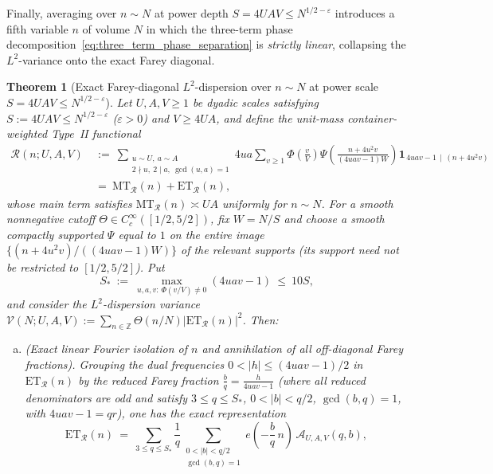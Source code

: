 \documentclass[11pt, a4paper]{article}
\theoremstyle{plain}
\newtheorem{theorem}{Theorem}[section]
\theoremstyle{definition}
\newcommand{\Z}{\mathbb{Z}}
\begin{document}
Finally, averaging over $n\sim N$ at power depth $S=4UAV\le N^{1/2-\varepsilon}$ introduces a fifth variable $n$ of volume $N$ in which the three-term phase decomposition~\eqref{eq:three_term_phase_separation} is \emph{strictly linear}, collapsing the $L^{2}$-variance onto the exact Farey diagonal.

\begin{theorem}[Exact Farey-diagonal $L^{2}$-dispersion over $n\sim N$ at power scale $S=\allowbreak 4UAV\le\allowbreak N^{1/2-\varepsilon}$]\label{thm:farey_diagonal_L2_dispersion}
Let $U,A,V\ge1$ be dyadic scales satisfying $S:=4UAV\le N^{1/2-\varepsilon}$ ($\varepsilon>0$) and $V\ge 4UA$, and define the unit-mass container-weighted Type~II functional
\begin{equation}\label{eq:unit_mass_R_n}
\begin{split}
\mathcal{R}(n;U,A,V)\ &:=\ \sum_{\substack{u\sim U,\ a\sim A\\ 2\nmid u,\ 2\mid a,\ \gcd(u,a)=1}}4ua\sum_{v\ge1}\Phi\!\left(\frac{v}{V}\right)\Psi\!\left(\frac{n+4u^{2}v}{(4uav-1)W}\right)\mathbf{1}_{\,4uav-1\,\mid\,(n+4u^{2}v)}\\
&=\ \mathrm{MT}_{\mathcal{R}}(n)+\mathrm{ET}_{\mathcal{R}}(n),
\end{split}
\end{equation}
whose main term satisfies $\mathrm{MT}_{\mathcal{R}}(n)\asymp UA$ uniformly for $n\sim N$. For a smooth nonnegative cutoff $\Theta\in C_c^{\infty}([1/2,5/2])$, fix $W=N/S$ and choose a smooth compactly supported $\Psi$ equal to $1$ on the entire image $\{(n+4u^{2}v)/((4uav-1)W)\}$ of the relevant supports (its support need not be restricted to $[1/2,5/2]$). Put
\[
S_{\ast}\ :=\ \max_{u,a,v:\,\Phi(v/V)\ne0}(4uav-1)\ \le\ 10S,
\]
and consider the $L^{2}$-dispersion variance $\mathcal{V}(N;U,A,V):=\sum_{n\in\Z}\Theta(n/N)\big|\mathrm{ET}_{\mathcal{R}}(n)\big|^{2}$. Then:
\begin{enumerate}[(a)]
    \item \emph{(Exact linear Fourier isolation of $n$ and annihilation of all off-diagonal Farey fractions).} Grouping the dual frequencies $0<|h|\le(4uav-1)/2$ in $\mathrm{ET}_{\mathcal{R}}(n)$ by the reduced Farey fraction $\frac{b}{q}=\frac{h}{4uav-1}$ (where all reduced denominators are odd and satisfy $3\le q\le S_{\ast}$, $0<|b|<q/2$, $\gcd(b,q)=1$, with $4uav-1=qr$), one has the exact representation
    \begin{equation}\label{eq:Farey_grouped_ET}
    \mathrm{ET}_{\mathcal{R}}(n)\ =\ \sum_{3\le q\le S_{\ast}}\frac{1}{q}\sum_{\substack{0<|b|<q/2\\ \gcd(b,q)=1}}e\!\left(-\frac{b}{q}\,n\right)\,\mathcal{A}_{U,A,V}(q,b),

\end{equation}
\end{enumerate}
\end{theorem}
\end{document}
